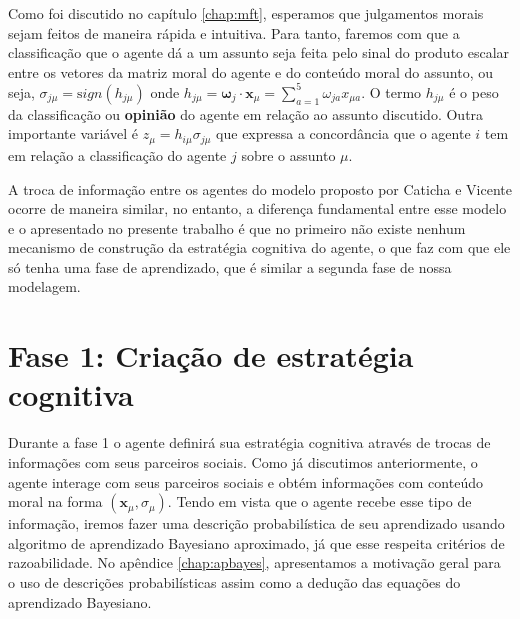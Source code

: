Como foi discutido no capítulo \ref{chap:mft}, esperamos que julgamentos
morais sejam feitos de maneira rápida e intuitiva. Para tanto, faremos com
que a classificação que o agente dá a um assunto seja feita pelo sinal
do produto escalar entre os vetores da matriz moral do agente e do conteúdo
moral do assunto, ou seja, $\sigma_{j \mu} = \mathrm sign ( h_{j \mu})$ onde
$h_{j \mu} = \bm \omega_j\cdot \bm x_\mu = \sum_{a=1}^5 \omega_{j a}x_{\mu
a}$. O termo $h_{j\mu}$ é o peso da classificação ou \textbf{opinião}
do agente em relação ao assunto discutido. Outra importante variável é
$z_\mu = h_{i\mu}\sigma_{j\mu}$ que expressa a concordância que o agente $i$
tem em relação a classificação do agente $j$ sobre o assunto $\mu$.

A troca de informação entre os agentes do modelo proposto por Caticha
e Vicente\citep{Caticha2011a} ocorre de maneira similar, no entanto,
a diferença fundamental entre esse modelo e o apresentado no presente
trabalho é que no primeiro não existe nenhum mecanismo de construção da
estratégia cognitiva do agente, o que faz com que ele só tenha uma fase
de aprendizado, que é similar a segunda fase de nossa modelagem.

\section{Fase 1: Criação de estratégia cognitiva} %
\label{sec:ecog}

Durante a fase 1 o agente definirá sua estratégia cognitiva através de
trocas de informações com seus parceiros sociais. Como já discutimos
anteriormente, o agente interage com seus parceiros sociais e obtém
informações com conteúdo moral na forma $(\bm x_\mu, \sigma_\mu)$. Tendo
em vista que o agente recebe esse tipo de informação, iremos fazer uma
descrição probabilística de seu aprendizado usando algoritmo de aprendizado
Bayesiano aproximado, já que esse respeita critérios de razoabilidade. No
apêndice \ref{chap:apbayes}, apresentamos a motivação geral para o uso
de descrições probabilísticas assim como a dedução das equações do
aprendizado Bayesiano.


